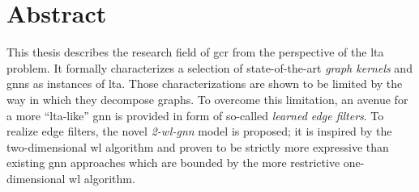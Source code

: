 %
\chapter*{Abstract}%
\label{sec:abstract}
\vspace*{-10mm}

This thesis describes the research field of \acl{gcr} from the perspective of the \ac{lta} problem.
It formally characterizes a selection of state-of-the-art \textit{graph kernels} and \acp{gnn} as instances of \ac{lta}.
Those characterizations are shown to be limited by the way in which they decompose graphs.
To overcome this limitation, an avenue for a more ``\acs{lta}-like'' \ac{gnn} is provided in form of so-called \textit{learned edge filters}.
To realize edge filters, the novel \textit{2-\acs*{wl}-\acs*{gnn}} model is proposed;
it is inspired by the two-dimensional \ac{wl} algorithm and proven to be strictly more expressive than existing \ac{gnn} approaches which are bounded by the more restrictive one-dimensional \ac{wl} algorithm.

